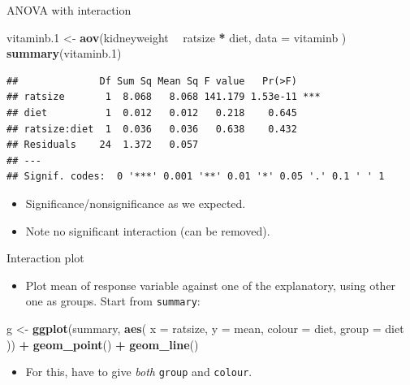 \documentclass[ignorenonframetext,]{beamer}
\newenvironment{Shaded}{\begin{snugshade}}{\end{snugshade}}
\newcommand{\DataTypeTok}[1]{\textcolor[rgb]{0.13,0.29,0.53}{#1}}
\newcommand{\FloatTok}[1]{\textcolor[rgb]{0.00,0.00,0.81}{#1}}
\newcommand{\KeywordTok}[1]{\textcolor[rgb]{0.13,0.29,0.53}{\textbf{#1}}}
\newcommand{\NormalTok}[1]{#1}
\newcommand{\OperatorTok}[1]{\textcolor[rgb]{0.81,0.36,0.00}{\textbf{#1}}}
\newcommand{\StringTok}[1]{\textcolor[rgb]{0.31,0.60,0.02}{#1}}
\providecommand{\tightlist}{%
  \setlength{\itemsep}{0pt}\setlength{\parskip}{0pt}}
\begin{document}
\begin{frame}[fragile]{ANOVA with interaction}
\protect\hypertarget{anova-with-interaction}{}

\begin{Shaded}
\begin{Highlighting}[]
\NormalTok{vitaminb}\FloatTok{.1}\NormalTok{ <-}\StringTok{ }\KeywordTok{aov}\NormalTok{(kidneyweight }\OperatorTok{~}\StringTok{ }\NormalTok{ratsize }\OperatorTok{*}\StringTok{ }\NormalTok{diet,}
  \DataTypeTok{data =}\NormalTok{ vitaminb}
\NormalTok{)}
\KeywordTok{summary}\NormalTok{(vitaminb}\FloatTok{.1}\NormalTok{)}
\end{Highlighting}
\end{Shaded}

\begin{verbatim}
##              Df Sum Sq Mean Sq F value   Pr(>F)    
## ratsize       1  8.068   8.068 141.179 1.53e-11 ***
## diet          1  0.012   0.012   0.218    0.645    
## ratsize:diet  1  0.036   0.036   0.638    0.432    
## Residuals    24  1.372   0.057                     
## ---
## Signif. codes:  0 '***' 0.001 '**' 0.01 '*' 0.05 '.' 0.1 ' ' 1
\end{verbatim}

\begin{itemize}
\tightlist
\item
  Significance/nonsignificance as we expected.
\item
  Note no significant interaction (can be removed).
\end{itemize}

\end{frame}

\begin{frame}[fragile]{Interaction plot}
\protect\hypertarget{interaction-plot}{}

\begin{itemize}
\tightlist
\item
  Plot mean of response variable against one of the explanatory, using
  other one as groups. Start from \texttt{summary}:
\end{itemize}

\begin{Shaded}
\begin{Highlighting}[]
\NormalTok{g <-}\StringTok{ }\KeywordTok{ggplot}\NormalTok{(summary, }\KeywordTok{aes}\NormalTok{(}
  \DataTypeTok{x =}\NormalTok{ ratsize, }\DataTypeTok{y =}\NormalTok{ mean,}
  \DataTypeTok{colour =}\NormalTok{ diet, }\DataTypeTok{group =}\NormalTok{ diet}
\NormalTok{)) }\OperatorTok{+}
\StringTok{  }\KeywordTok{geom_point}\NormalTok{() }\OperatorTok{+}\StringTok{ }\KeywordTok{geom_line}\NormalTok{()}
\end{Highlighting}
\end{Shaded}

\begin{itemize}
\tightlist
\item
  For this, have to give \emph{both} \texttt{group} and \texttt{colour}.
\end{itemize}

\end{frame}
\end{document}
